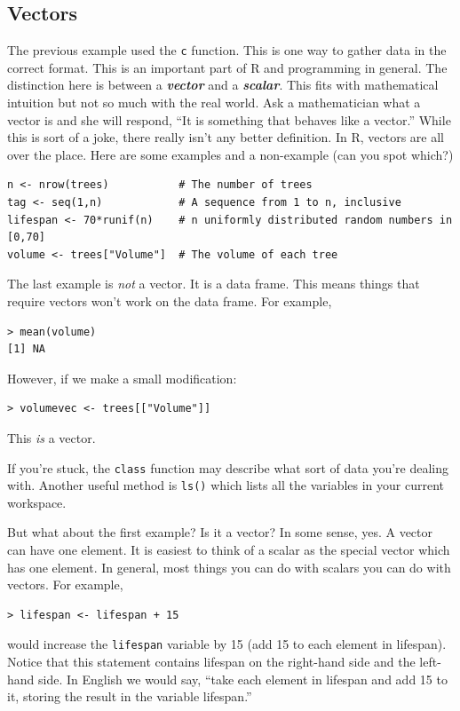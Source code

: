 \documentclass[12pt]{article}
\theoremstyle{remark}
\newcommand{\vocab}[1]{\textbf{\emph{#1}}}
\begin{document}
\subsection{Vectors}
The previous example used the \verb|c| function. This is one way to gather data in the correct format. This is an important part of R and programming in general. The distinction here is between a \vocab{vector} and a \vocab{scalar}. This fits with mathematical intuition but not so much with the real world. Ask a mathematician what a vector is and she will respond, ``It is something that behaves like a vector.'' While this is sort of a joke, there really isn't any better definition. In R, vectors are all over the place. Here are some examples and a non-example (can you spot which?)
\begin{Verbatim}[frame=single, fontsize=\small]
n <- nrow(trees)           # The number of trees
tag <- seq(1,n)            # A sequence from 1 to n, inclusive
lifespan <- 70*runif(n)    # n uniformly distributed random numbers in [0,70]
volume <- trees["Volume"]  # The volume of each tree
\end{Verbatim}

The last example is \emph{not} a vector. It is a data frame. This means things that require vectors won't work on the data frame. For example,
\begin{verbatim}
> mean(volume)
[1] NA
\end{verbatim}

However, if we make a small modification:
\begin{verbatim}
> volumevec <- trees[["Volume"]]
\end{verbatim}
This \emph{is} a vector.

If you're stuck, the \verb|class| function may describe what sort of data you're dealing with. Another useful method is \verb|ls()| which lists all the variables in your current workspace.

But what about the first example? Is it a vector? In some sense, yes. A vector can have one element. It is easiest to think of a scalar as the special vector which has one element. In general, most things you can do with scalars you can do with vectors. For example,
\begin{verbatim}
> lifespan <- lifespan + 15
\end{verbatim}
would increase the \verb|lifespan| variable by 15 (add 15 to each element in lifespan). Notice that this statement contains lifespan on the right-hand side and the left-hand side. In English we would say, ``take each element in lifespan and add 15 to it, storing the result in the variable lifespan.''
\end{document}
